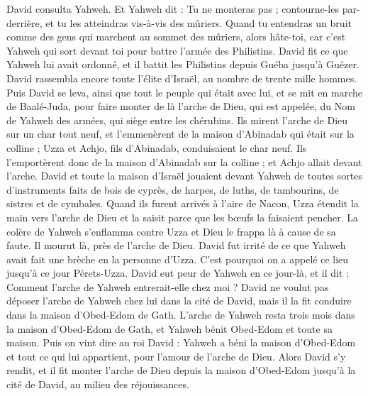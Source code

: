 \begin{multicols}{2}
David consulta Yahweh. Et Yahweh dit : Tu ne monteras pas ; contourne-les par-derrière, et tu les atteindras vis-à-vis des mûriers.
Quand tu entendras un bruit comme des gens qui marchent au sommet des mûriers, alors hâte-toi, car c'est Yahweh qui sort devant toi pour battre l'armée des Philistins.
David fit ce que Yahweh lui avait ordonné, et il battit les Philistins depuis Guéba jusqu'à Guézer.
\VerseOne{}David rassembla encore toute l'élite d'Israël, au nombre de trente mille hommes.
Puis David se leva, ainsi que tout le peuple qui était avec lui, et se mit en marche de Baalé-Juda, pour faire monter de là l'arche de Dieu, qui est appelée, du Nom de Yahweh des armées, qui siège entre les chérubins.
Ils mirent l'arche de Dieu sur un char tout neuf, et l'emmenèrent de la maison d'Abinadab qui était sur la colline ; Uzza et Achjo, fils d'Abinadab, conduisaient le char neuf.
Ils l'emportèrent donc de la maison d'Abinadab sur la colline ; et Achjo allait devant l'arche.
David et toute la maison d'Israël jouaient devant Yahweh de toutes sortes d'instruments faits de bois de cyprès, de harpes, de luths, de tambourins, de sistres et de cymbales.
Quand ils furent arrivés à l'aire de Nacon, Uzza étendit la main vers l'arche de Dieu et la saisit parce que les bœufs la faisaient pencher.
La colère de Yahweh s'enflamma contre Uzza et Dieu le frappa là à cause de sa faute. Il mourut là, près de l'arche de Dieu.
David fut irrité de ce que Yahweh avait fait une brèche en la personne d'Uzza. C'est pourquoi on a appelé ce lieu jusqu'à ce jour Pérets-Uzza.
David eut peur de Yahweh en ce jour-là, et il dit : Comment l'arche de Yahweh entrerait-elle chez moi ?
David ne voulut pas déposer l'arche de Yahweh chez lui dans la cité de David, mais il la fit conduire dans la maison d'Obed-Edom de Gath.
L'arche de Yahweh resta trois mois dans la maison d'Obed-Edom de Gath, et Yahweh bénit Obed-Edom et toute sa maison.
Puis on vint dire au roi David : Yahweh a béni la maison d'Obed-Edom et tout ce qui lui appartient, pour l'amour de l'arche de Dieu. Alors David s'y rendit, et il fit monter l'arche de Dieu depuis la maison d'Obed-Edom jusqu'à la cité de David, au milieu des réjouissances.

\end{multicols}
